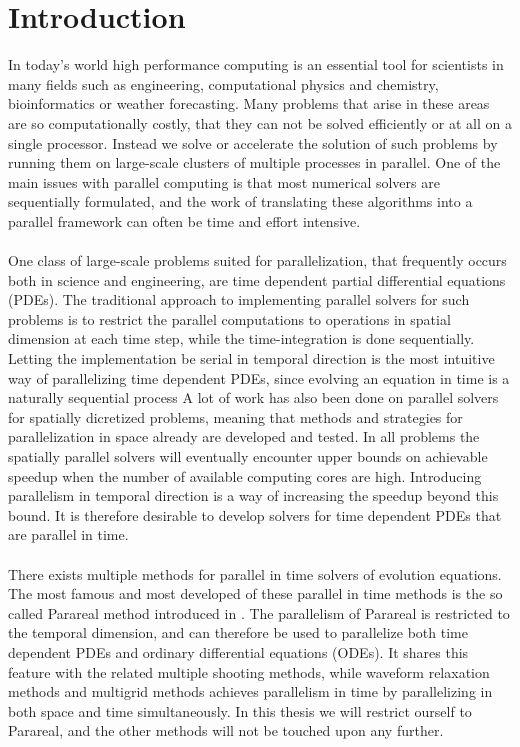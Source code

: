 \chapter{Introduction}
In today’s world high performance computing is an essential tool for scientists in many fields such as engineering, computational physics and chemistry, bioinformatics or weather forecasting. Many problems that arise in these areas are so computationally costly, that they can not be solved efficiently or at all on a single processor. Instead we solve or accelerate the solution of such problems by running them on large-scale clusters of multiple processes in parallel. One of the main issues with parallel computing is that most numerical solvers are sequentially formulated, and the work of translating these algorithms into a parallel framework can often be time and effort intensive.
\\
\\
One class of large-scale problems suited for parallelization, that frequently occurs both in science and engineering, are time dependent partial differential equations (PDEs). The traditional approach to implementing parallel solvers for such problems is to restrict the parallel computations to operations in spatial dimension at each time step, while the time-integration is done sequentially. Letting the implementation be serial in temporal direction is the most intuitive way of parallelizing time dependent PDEs, since evolving an equation in time is a naturally sequential process A lot of work has also been done on parallel solvers for spatially dicretized problems, meaning that methods and strategies for parallelization in space already are developed and tested. In all problems the spatially parallel solvers will eventually encounter upper bounds on achievable speedup when the number of available computing cores are high. Introducing parallelism in temporal direction is a way of increasing the speedup beyond this bound. It is therefore desirable to develop solvers for time dependent PDEs that are parallel in time.
\\
\\
There exists multiple methods for parallel in time solvers of evolution equations. The most famous and most developed of these parallel in time methods is the so called Parareal method introduced in \cite{lions2001resolution}. The parallelism of Parareal is restricted to the temporal dimension, and can therefore be used to parallelize both time dependent PDEs and ordinary differential equations (ODEs). It shares this feature with the related multiple shooting methods\cite{nievergelt1964parallel,bellen1989parallel}, while waveform relaxation methods\cite{lelarasmee1982waveform,gander1996overlapping} and multigrid methods\cite{hackbusch1985parabolic,lubich1987multi,horton1995space} achieves parallelism in time by parallelizing in both space and time simultaneously. In this thesis we will restrict ourself to Parareal, and the other methods will not be touched upon any further.
